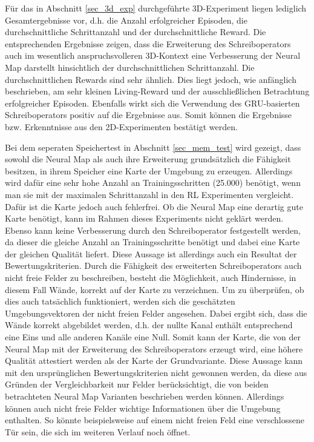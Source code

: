 Für das in Abschnitt \ref{sec_3d_exp} durchgeführte 3D-Experiment liegen lediglich Gesamtergebnisse vor, d.h. die Anzahl erfolgreicher Episoden, die durchschnittliche Schrittanzahl und der durchschnittliche Reward. Die entsprechenden Ergebnisse zeigen, dass die Erweiterung des Schreiboperators auch im wesentlich anspruchsvolleren 3D-Kontext eine Verbesserung der Neural Map darstellt hinsichtlich der durchschnittlichen Schrittanzahl. Die durchschnittlichen Rewards sind sehr ähnlich. Dies liegt jedoch, wie anfänglich beschrieben, am sehr kleinen Living-Reward und der ausschließlichen Betrachtung erfolgreicher Episoden. Ebenfalls wirkt sich die Verwendung des GRU-basierten Schreiboperators positiv auf die Ergebnisse aus. Somit können die Ergebnisse bzw. Erkenntnisse aus den 2D-Experimenten bestätigt werden.

Bei dem seperaten Speichertest in Abschnitt \ref{sec_mem_test} wird gezeigt, dass sowohl die Neural Map als auch ihre Erweiterung grundsätzlich die Fähigkeit besitzen, in ihrem Speicher eine Karte der Umgebung zu erzeugen. Allerdings wird dafür eine sehr hohe Anzahl an Trainingsschritten (25.000) benötigt, wenn man sie mit der maximalen Schrittanzahl in den RL Experimenten vergleicht. Dafür ist die Karte jedoch auch fehlerfrei. Ob die Neural Map eine derartig gute Karte benötigt, kann im Rahmen dieses Experiments nicht geklärt werden. Ebenso kann keine Verbesserung durch den Schreiboperator festgestellt werden, da dieser die gleiche Anzahl an Trainingsschritte benötigt und dabei eine Karte der gleichen Qualität liefert. Diese Aussage ist allerdings auch ein Resultat der Bewertungskriterien. Durch die Fähigkeit des erweiterten Schreiboperators auch nicht freie Felder zu beschreiben, besteht die Möglichkeit, auch Hindernisse, in diesem Fall Wände, korrekt auf der Karte zu verzeichnen. Um zu überprüfen, ob dies auch tatsächlich funktioniert, werden sich die geschätzten Umgebungsvektoren der nicht freien Felder angesehen. Dabei ergibt sich, dass die Wände korrekt abgebildet werden, d.h. der nullte Kanal enthält entsprechend eine Eins und alle anderen Kanäle eine Null. Somit kann der Karte, die von der Neural Map mit der Erweiterung des Schreiboperators erzeugt wird, eine höhere Qualität attestiert werden als der Karte der Grundvariante. Diese Aussage kann mit den ursprünglichen Bewertungskriterien nicht gewonnen werden, da diese aus Gründen der Vergleichbarkeit nur Felder berücksichtigt, die von beiden betrachteten Neural Map Varianten beschrieben werden können. Allerdings können auch nicht freie Felder wichtige Informationen über die Umgebung enthalten. So könnte beispielsweise auf einem nicht freien Feld eine verschlossene Tür sein, die sich im weiteren Verlauf noch öffnet.


